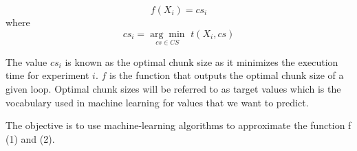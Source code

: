 \begin{equation}
	f(X_i)=cs_i
\end{equation}
 where
\begin{equation}
 cs_i=\underset{cs \in CS}{\arg\min} \, \, t(X_i,cs)
\end{equation}


The  value $cs_i$ is known as the optimal chunk size as it minimizes the execution time for experiment $i$. $f$ is the function that outputs the optimal chunk size of a given loop. Optimal chunk sizes will be referred to as target values which is the vocabulary used in machine learning for values that we want to predict.

The objective is to use machine-learning algorithms to approximate the function f (1) and (2).
